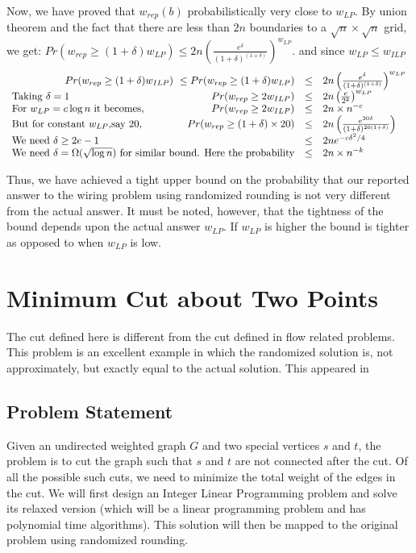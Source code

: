 Now, we have proved that $w_{rep}(b)$ probabilistically very close to $w_{LP}$. By union theorem and the fact that there are less than $2n$ boundaries to a $\sqrt{n} \times \sqrt{n}$ grid, we get: $Pr(w_{rep}\geq (1+\delta)w_{LP}) \leq 2n\left(\frac{e^\delta}{(1+\delta)^{(1+\delta)}}\right)^{w_{LP}}$. and since $w_{LP} \leq w_{ILP}$
\[
	\begin{array}{lrcl}
	\multicolumn{2}{r}{Pr(w_{rep}\geq (1+\delta)w_{ILP})  \, \, \leq   Pr(w_{rep}\geq (1+\delta)w_{LP})} 
	& \leq & 2n\left(\frac{e^\delta}{(1+\delta)^{(1+\delta)}}\right)^{w_{LP}} \\
	$Taking $\delta = 1 & Pr(w_{rep}\geq 2w_{ILP})& \leq & 2n\left(\frac{e}{2^{2}}\right)^{w_{LP}} \\
	$For $w_{LP} = c\log n $ it becomes,$  & Pr(w_{rep}\geq 2w_{ILP}) & \leq & 2n \times n^{-c}\\
	$But for constant $w_{LP}, $say 20$, & Pr(w_{rep}\geq (1+\delta)\times 20) & \leq & 2n\left(\frac{e^{20\delta}}{(1+\delta)^{20(1+\delta)}}\right) \\
$We need $\delta \geq 2e-1 & & \leq & 2ne^{-c \delta^2/4} \\
\multicolumn{2}{l}{$We need $\delta = \Omega(\sqrt{\log n})$ for similar bound. Here the probability$} & \leq & 2n\times n^{-k}\\
\end{array} 
\]

Thus, we have achieved a tight upper bound on the probability that our reported answer to the wiring problem using randomized rounding is not very different from the actual answer. It must be noted, however, that the tightness of the bound depends upon the actual answer $w_{LP}$. If $w_{LP}$ is higher the bound is tighter as opposed to when $w_{LP}$ is low.
\section{Minimum Cut about Two Points}
The cut defined here is different from the cut defined in flow related problems. This problem is an excellent example in which the randomized solution is, not approximately, but exactly equal to the actual solution. This appeared in \cite{srinivasan}
\subsection{Problem Statement}
Given an undirected weighted graph $G$ and two special vertices $s$ and $t$, the problem is to cut
the graph such that $s$ and $t$ are not connected after the cut. Of all the possible such cuts, we need to
minimize the total weight of the edges in the cut. We will first design an Integer Linear Programming problem and solve its relaxed version (which will be a linear programming problem and has polynomial 
time algorithms). This solution will then be mapped to the original problem using randomized rounding.

